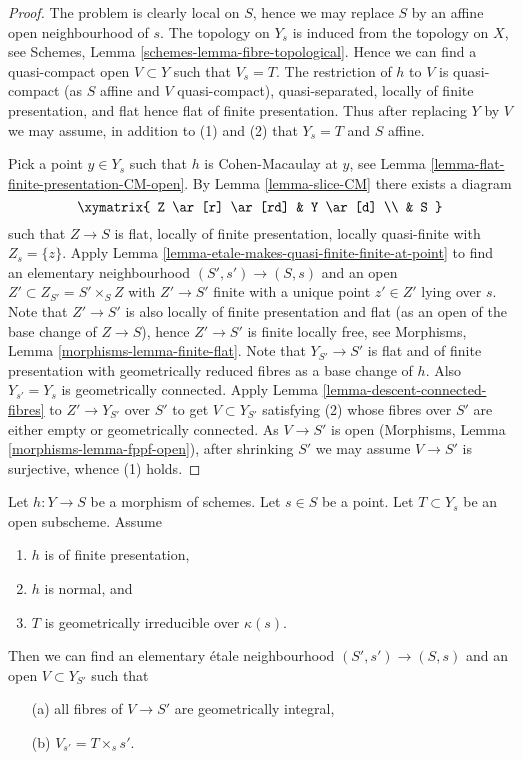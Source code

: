 \begin{proof}
The problem is clearly local on $S$, hence we may replace $S$ by an
affine open neighbourhood of $s$.
The topology on $Y_s$ is induced from the topology on $X$, see
Schemes, Lemma \ref{schemes-lemma-fibre-topological}.
Hence we can find a quasi-compact open $V \subset Y$ such that $V_s = T$.
The restriction of $h$ to $V$ is quasi-compact (as $S$ affine and $V$
quasi-compact), quasi-separated, locally of finite presentation, and
flat hence flat of finite presentation.
Thus after replacing $Y$ by $V$ we may assume, in addition
to (1) and (2) that $Y_s = T$ and $S$ affine.

\medskip\noindent
Pick a point $y \in Y_s$ such that $h$ is Cohen-Macaulay at $y$, see
Lemma \ref{lemma-flat-finite-presentation-CM-open}.
By
Lemma \ref{lemma-slice-CM}
there exists a diagram
$$
\xymatrix{
Z \ar[r] \ar[rd] & Y \ar[d] \\
& S
}
$$
such that $Z \to S$ is flat, locally of finite presentation, locally
quasi-finite with $Z_s = \{z\}$. Apply
Lemma \ref{lemma-etale-makes-quasi-finite-finite-at-point}
to find an elementary neighbourhood $(S', s') \to (S, s)$ and an open
$Z' \subset Z_{S'} = S' \times_S Z$ with $Z' \to S'$ finite with a unique
point $z' \in Z'$ lying over $s$. Note that $Z' \to S'$ is also
locally of finite presentation and flat (as an open of the base change
of $Z \to S$), hence $Z' \to S'$ is finite locally free, see
Morphisms, Lemma \ref{morphisms-lemma-finite-flat}.
Note that $Y_{S'} \to S'$ is flat and of finite presentation
with geometrically reduced fibres as a base change of $h$.
Also $Y_{s'} = Y_s$ is geometrically connected.
Apply Lemma \ref{lemma-descent-connected-fibres}
to $Z' \to Y_{S'}$ over $S'$ to get $V \subset Y_{S'}$
satisfying (2) whose fibres over $S'$ are either empty or
geometrically connected. As $V \to S'$ is open
(Morphisms, Lemma \ref{morphisms-lemma-fppf-open}), after shrinking
$S'$ we may assume $V \to S'$ is surjective, whence (1) holds.
\end{proof}

\begin{lemma}
\label{lemma-normal-morphism-irreducible}
Let $h : Y \to S$ be a morphism of schemes.
Let $s \in S$ be a point.
Let $T \subset Y_s$ be an open subscheme.
Assume
\begin{enumerate}
\item $h$ is of finite presentation,
\item $h$ is normal, and
\item $T$ is geometrically irreducible over $\kappa(s)$.
\end{enumerate}
Then we can find an elementary \'etale neighbourhood $(S', s') \to (S, s)$
and an open $V \subset Y_{S'}$ such that
\begin{enumerate}
\item[(a)] all fibres of $V \to S'$ are geometrically integral,
\item[(b)] $V_{s'} = T \times_s s'$.
\end{enumerate}
\end{lemma}


